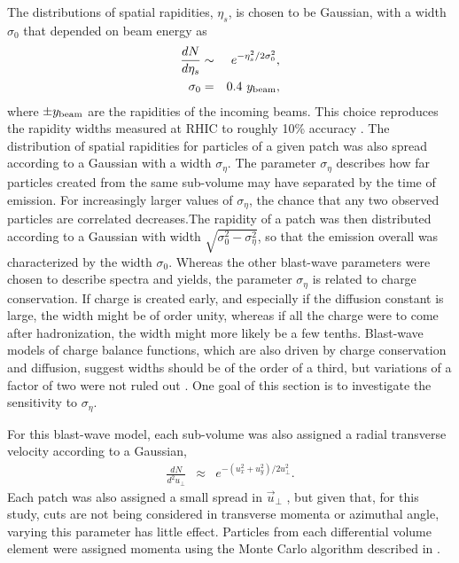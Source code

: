 The distributions of spatial rapidities, $\eta_s$, is chosen to be Gaussian, with a width $\sigma_0$ that depended on beam energy as
\begin{eqnarray}
\frac{dN}{d\eta_s}&\sim& e^{-\eta_s^2/2\sigma_0^2},\\
\nonumber
\sigma_0&=&0.4~y_{\rm beam},
\end{eqnarray}
where $\pm y_{\rm beam}$ are the rapidities of the incoming beams. This choice reproduces the rapidity widths measured at RHIC to roughly 10\% accuracy \cite{Flores:2016mtp}. The distribution of spatial rapidities for particles of a given patch was also spread according to a Gaussian with a width $\sigma_\eta$. The parameter $\sigma_\eta$ describes how far particles created from the same sub-volume may have separated by the time of emission. For increasingly larger values of $\sigma_\eta$, the chance that any two observed particles are correlated decreases.The rapidity of a patch was then distributed according to a Gaussian with width $\sqrt{\sigma_0^2-\sigma_\eta^2}$, so that the emission overall was characterized by the width $\sigma_0$. Whereas the other blast-wave parameters were chosen to describe spectra and yields, the parameter $\sigma_\eta$ is related to charge conservation. If charge is created early, and especially if the diffusion constant is large, the width might be of order unity, whereas if all the charge were to come after hadronization, the width might more likely be a few tenths. Blast-wave models of charge balance functions, which are also driven by charge conservation and diffusion, suggest widths should be of the order of a third, but variations of a factor of two were not ruled out \cite{Schlichting:2010qia}. One goal of this section is to investigate the sensitivity to $\sigma_\eta$.

For this blast-wave model, each sub-volume was also assigned a radial transverse velocity according to a Gaussian,
\begin{eqnarray}
\frac{dN}{d^2u_\perp}&\approx&e^{-(u_x^2+u_y^2)/2u_\perp^2}.
\end{eqnarray}
Each patch was also assigned a small spread in $\vec{u}_\perp$ , but given that, for this study, cuts are not being considered in transverse momenta or azimuthal angle, varying this parameter has little effect. Particles from each differential volume element were assigned momenta using the Monte Carlo algorithm described in \cite{Pratt:2010jt}.

